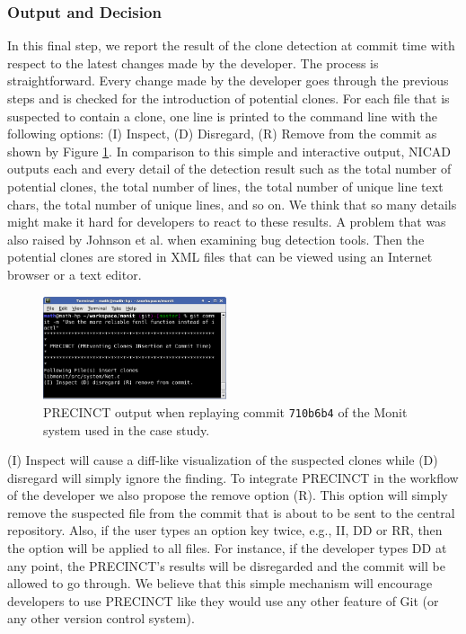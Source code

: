 \subsubsection{Output and Decision}
\label{sub:Output and Decision}

In this final step, we report the result of the clone detection at commit time with respect to the latest changes made by the developer. The process is straightforward. Every change made by the developer goes through the previous steps and is checked for the introduction of potential clones. For each file that is suspected to contain a clone, one line is printed to the command line with the following options: (I) Inspect, (D) Disregard, (R) Remove from the commit as shown by Figure \ref{fig:hook}. In comparison to this simple and interactive output, NICAD outputs each and every detail of the detection result such as the total number of potential clones, the total number of lines, the total number of unique line text chars, the total number of unique lines, and so on. We think that so many details might make it hard for developers to react to these results. A problem that was also raised by Johnson et al. \cite{Johnson2013} when examining bug detection tools.
Then the potential clones are stored in XML files that can be viewed using an Internet browser or a text editor.

\begin{figure}
  \centering
    \includegraphics[width=0.48\textwidth]{media/commit.png}
    \caption{PRECINCT output when replaying commit \texttt{710b6b4} of the Monit system used in the case study.\label{fig:hook}}
\end{figure}

(I) Inspect will cause a diff-like visualization of the suspected clones while (D) disregard will simply ignore the finding.
To integrate PRECINCT in the workflow of the developer we also propose the  remove option (R). This option will simply remove the suspected file from the commit that is about to be sent to the central repository.
Also, if the user types an option key twice, e.g., II, DD or RR, then the option will be applied to all files.
For instance, if the developer types DD at any point, the PRECINCT's results will be disregarded and the commit will be allowed to go through. We believe that this simple mechanism will encourage developers to use PRECINCT like they would use any other feature of Git (or any other version control system).


